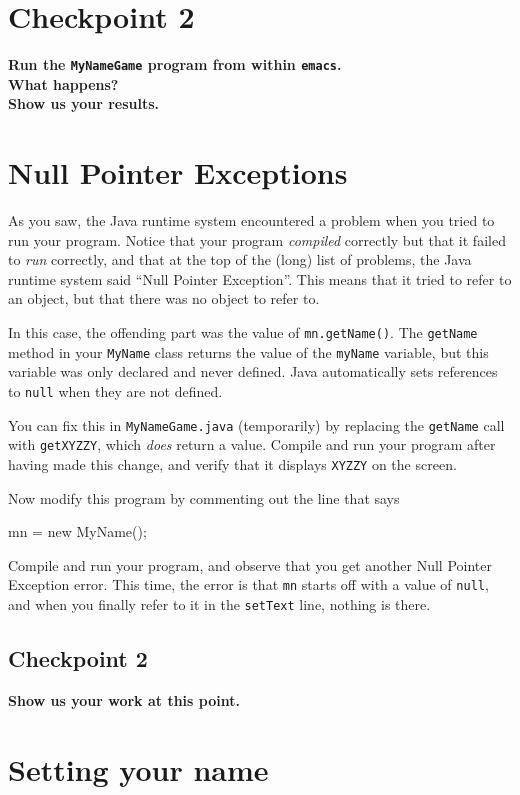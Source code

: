\documentclass[12pt]{article}
\newenvironment{qv}%
  {\quote
   \verbatim}%
  {\endverbatim
   \endquote}
\newcommand{\code}{\texttt}
\newcommand{\fname}{\texttt}
\begin{document}
\section*{Checkpoint 2}
{\bf
Run the \code{MyNameGame} program from within \fname{emacs}.\\
What happens?\\
Show us your results.
}

\section*{Null Pointer Exceptions}

As you saw, the Java runtime system encountered a problem when you
tried to run your program.  Notice that your program {\em compiled}
correctly but that it failed to {\em run} correctly, and that at the
top of the (long) list of problems, the Java runtime system said
``Null Pointer Exception''.  This means that it tried to refer to an
object, but that there was no object to refer to.

In this case, the offending part was the value of \code{mn.getName()}.
The \code{getName} method in your \code{MyName} class returns
the value of the \code{myName} variable,
but this variable was only declared and never defined.
Java automatically sets references to \code{null}
when they are not defined.

You can fix this in \code{MyNameGame.java} (temporarily) by replacing
the \code{getName} call with \code{getXYZZY}, which {\em does} return
a value.  Compile and run your program after having made this change,
and verify that it displays \code{XYZZY} on the screen.

Now modify this program by commenting out the line that says

\begin{qv}
mn = new MyName();
\end{qv}

Compile and run your program, and observe that you get another Null
Pointer Exception error.  This time, the error is that \code{mn}
starts off with a value of \code{null}, and when you finally refer to
it in the \code{setText} line, nothing is there.

\subsection*{Checkpoint 2}
{\bf
Show us your work at this point.
}

\section*{Setting your name}
\end{document}
